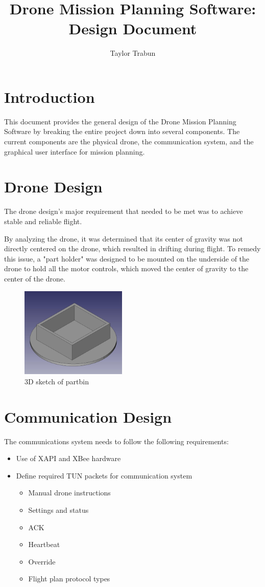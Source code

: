 \documentclass[12pt,a4paper]{article}
\author{Taylor Trabun}
\title{Drone Mission Planning Software: Design Document}
\begin{document}
\maketitle

\section{Introduction}
This document provides the general design of the Drone Mission Planning Software by breaking the entire project down into several components. The current components are the physical drone, the communication system, and the graphical user interface for mission planning.

\section{Drone Design}
The drone design's major requirement that needed to be met was to achieve stable and reliable flight. 

By analyzing the drone, it was determined that its center of gravity was not directly centered on the drone, which resulted in drifting during flight. To remedy this issue, a "part holder" was designed to be mounted on the underside of the drone to hold all the motor controls, which moved the center of gravity to the center of the drone. 

\begin{figure}[h!]

  \centering
    \includegraphics[width=0.45\textwidth]{partbin.jpg}
   \caption{3D sketch of partbin}
\end{figure}


\section{Communication Design}
The communications system needs to follow the following requirements:
\begin{itemize}
	\item Use of XAPI and XBee hardware
	\item Define required TUN packets for communication system 
	\begin{itemize}
		\item Manual drone instructions
		\item Settings and status
		\item ACK
		\item Heartbeat
		\item Override
		\item Flight plan protocol types
	\end{itemize}
\end{itemize}
\end{document}
